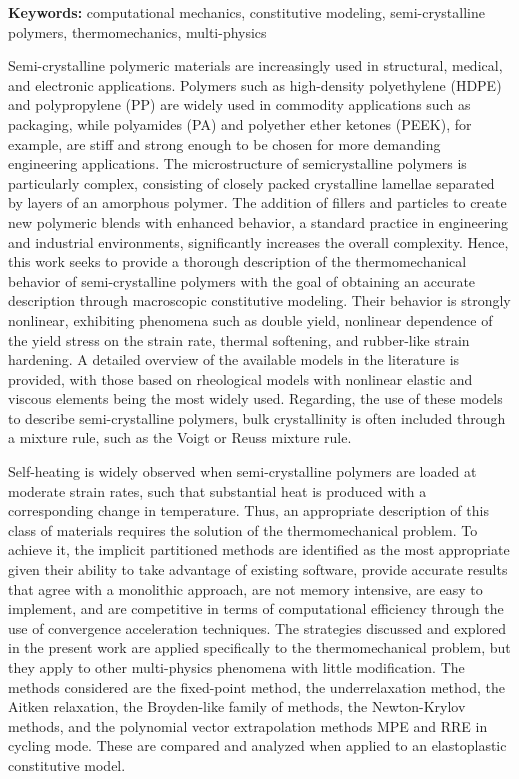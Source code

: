 \documentclass[a4paper, openright, twoside]{report}
\newcounter{problem}[chapter]\setcounter{problem}{1}
\begin{document}
\textbf{Keywords:} computational mechanics, constitutive modeling, semi-crystalline polymers, thermomechanics, multi-physics
\smallskip

Semi-crystalline polymeric materials are increasingly used in structural, medical, and electronic applications.
Polymers such as high-density polyethylene (HDPE) and polypropylene (PP) are widely used in commodity applications such as packaging, while polyamides (PA) and polyether ether ketones (PEEK), for example, are stiff and strong enough to be chosen for more demanding engineering applications.
The microstructure of semicrystalline polymers is particularly complex, consisting of closely packed crystalline lamellae separated by layers of an amorphous polymer.
The addition of fillers and particles to create new polymeric blends with enhanced behavior, a standard practice in engineering and industrial environments, significantly increases the overall complexity.
Hence, this work seeks to provide a thorough description of the thermomechanical behavior of semi-crystalline polymers with the goal of obtaining an accurate description through macroscopic constitutive modeling.
Their behavior is strongly nonlinear, exhibiting phenomena such as double yield, nonlinear dependence of the yield stress on the strain rate, thermal softening, and rubber-like strain hardening.
A detailed overview of the available models in the literature is provided, with those based on rheological models with nonlinear elastic and viscous elements being the most widely used.
Regarding, the use of these models to describe semi-crystalline polymers, bulk crystallinity is often included through a mixture rule, such as the Voigt or Reuss mixture rule.

Self-heating is widely observed when semi-crystalline polymers are loaded at moderate strain rates, such that substantial heat is produced with a corresponding change in temperature.
Thus, an appropriate description of this class of materials requires the solution of the thermomechanical problem.
To achieve it, the implicit partitioned methods are identified as the most appropriate given their ability to take advantage of existing software, provide accurate results that agree with a monolithic approach, are not memory intensive, are easy to implement, and are competitive in terms of computational efficiency through the use of convergence acceleration techniques.
The strategies discussed and explored in the present work are applied specifically to the thermomechanical problem, but they apply to other multi-physics phenomena with little modification.
The methods considered are the fixed-point method, the underrelaxation method, the Aitken relaxation, the Broyden-like family of methods, the Newton-Krylov methods, and the polynomial vector extrapolation methods MPE and RRE in cycling mode.
These are compared and analyzed when applied to an elastoplastic constitutive model.
\end{document}
